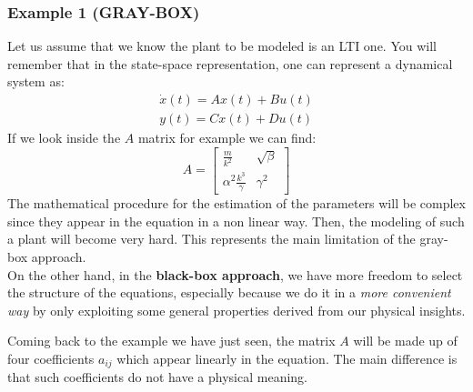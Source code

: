 \subsubsection{Example 1 (GRAY-BOX)}
Let us assume that we know the plant to be modeled is an LTI one. You will remember that in the state-space representation, one can represent a dynamical system as:
\begin{equation*}
    \begin{aligned}
        \dot{x}(t)=Ax(t)+Bu(t)\\
        y(t)=Cx(t)+Du(t)
    \end{aligned}
\end{equation*}
If we look inside the $A$ matrix for example we can find:
\begin{equation*}
    A=\begin{bmatrix}
        \frac{m}{k^2}&\sqrt{\beta}\\
        \alpha^2\frac{k^3}{\gamma}&\gamma^2
    \end{bmatrix}
\end{equation*}
The mathematical procedure for the estimation of the parameters will be complex since they appear in the equation in a non linear way. Then, the modeling of such a plant will become very hard. This represents the main limitation of the gray-box approach. \\

\vspace{1cm}
\noindent
On the other hand, in the \textbf{black-box approach}, we have more freedom to select the structure of the equations, especially because we do it in a \textit{more convenient way} by only exploiting some general properties derived from our physical insights.

Coming back to the example we have just seen, the matrix $A$ will be made up of four coefficients $a_{ij}$ which appear linearly in the equation. The main difference is that such coefficients do not have a physical meaning.

